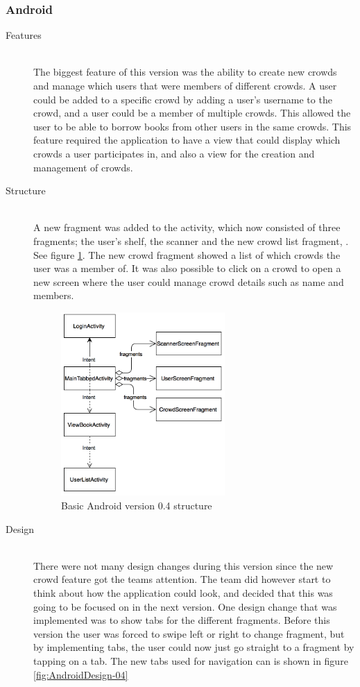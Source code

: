 \subsubsection{Android}
\begin{description}
    \item[Features] \hfill\\
The biggest feature of this version was the ability to create new crowds and manage which users that were members of different crowds. A user could be added to a specific crowd by adding a user's username to the crowd, and a user could be a member of multiple crowds. This allowed the user to be able to borrow books from other users in the same crowds. This feature required the application to have a view that could display which crowds a user participates in, and also a view for the creation and management of crowds. 

    \item[Structure] \hfill\\
A new fragment was added to the  activity, which now consisted of three fragments; the user's shelf, the scanner and the new crowd list fragment, . See figure \ref{fig:AndroidStructure-04}. The new crowd fragment showed a list of which crowds the user was a member of. It was also possible to click on a crowd to open a new screen where the user could manage crowd details such as name and members. 

\begin{figure}
\centering
\includegraphics[height=7cm]{figs/v04/AndroidStructure-04.png}
\caption{Basic Android version 0.4 structure}
\label{fig:AndroidStructure-04}
\end{figure}

    \item[Design] \hfill\\
There were not many design changes during this version since the new crowd feature got the teams attention. The team did however start to think about how the application could look, and decided that this was going to be focused on in the next version. One design change that was implemented was to show tabs for the different fragments. Before this version the user was forced to swipe left or right to change fragment, but by implementing tabs, the user could now just go straight to a fragment by tapping on a tab. The new tabs used for navigation can is shown in figure \ref{fig:AndroidDesign-04}


\end{description}
